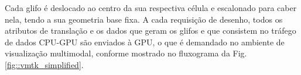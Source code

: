 \documentclass[
    12pt,                %
    oneside,            %
    a4paper,            %
    english,            %
    french,                %
    spanish,            %
    brazil                %
    ]{abntex2}
\begin{document}
Cada glifo é deslocado ao centro da sua respectiva célula e escalonado para caber nela, tendo a sua geometria base fixa. A cada requisição de desenho, todos os atributos de translação e os dados que geram os glifos e que consistem no tráfego de dados CPU-GPU são enviados à GPU, o que é demandado no ambiente de visualização multimodal, conforme mostrado no fluxograma da Fig. \ref{fig::vmtk_simplified}.

\begin{figure}[ht]
\centering
\captionsetup[subfloat]{farskip=5pt,nearskip=0pt}
    

\end{figure}
\end{document}
